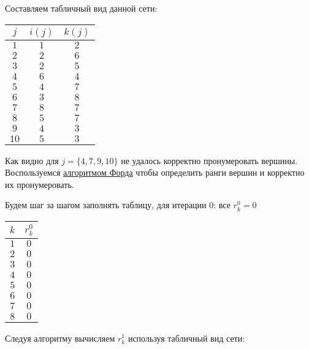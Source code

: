 Составляем табличный вид данной сети:

\begin{table}[H]
	\centering
	\begin{tabular}{ | c | c | c | } 
		\hline
		$j$ & $i(j)$ & $k(j)$ \\ \hline
		
		$1$ & $1$ & $2$ \\ \hline
		$2$ & $2$ & $6$ \\ \hline
		$3$ & $2$ & $5$ \\ \hline
		$4$ & $6$ & $4$ \\ \hline
		$5$ & $4$ & $7$ \\ \hline
		$6$ & $3$ & $8$ \\ \hline
		$7$ & $8$ & $7$ \\ \hline
		$8$ & $5$ & $7$ \\ \hline
		$9$ & $4$ & $3$ \\ \hline
		$10$ & $5$ & $3$ \\ \hline
	\end{tabular}
\end{table}

Как видно для $j = \{4, 7, 9, 10\}$ не удалось корректно пронумеровать вершины. Воспользуемся \hyperref[alg:ford]{алгоритмом Форда} чтобы определить ранги вершин и корректно их пронумеровать.

Будем шаг за шагом заполнять таблицу, для итерации 0: все $r_k^0 = 0$

\begin{table}[H]
	\centering
	\begin{tabular}{ | c | c | } 
		\hline
		$k$ & $r_k^0$ \\ \hline
		$1$ & $0$ \\ \hline
		$2$ & $0$ \\ \hline
		$3$ & $0$ \\ \hline
		$4$ & $0$ \\ \hline
		$5$ & $0$ \\ \hline
		$6$ & $0$ \\ \hline
		$7$ & $0$ \\ \hline
		$8$ & $0$ \\ \hline
	\end{tabular}
\end{table}


\bigskip

Следуя алгоритму вычисляем $r^1_k$ используя табличный вид сети:

